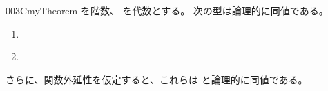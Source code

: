 \documentclass[index]{subfiles}
\begin{document}
\begin{myBlock}{003C}{myTheorem}
  を階数、
  を\myInlineMath{\myNat}代数とする。
  次の型は論理的に同値である。
  \begin{enumerate}
  \item \label{003C:0000} 
  \item \label{003C:0001} 
  \end{enumerate}
  さらに、関数外延性を仮定すると、これらは
  と論理的に同値である。
\end{myBlock}
\end{document}
